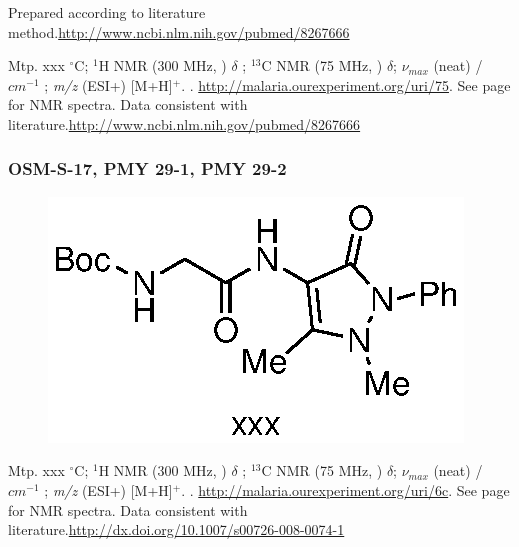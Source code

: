 \documentclass[12pt, a4paper,titlepage]{article}
\begin{document}
Prepared according to literature method.\url{http://www.ncbi.nlm.nih.gov/pubmed/8267666}

Mtp. xxx $^\circ$C;
$^1$H NMR (300 MHz, ) $\delta$ ; 
$^{13}$C NMR (75 MHz, ) $\delta$;
 $\nu_{max}$ (neat) /$cm^{-1}$ ;
\emph{m/z} (ESI+) [M+H]$^+$.
.
\url{http://malaria.ourexperiment.org/uri/75}.
 See page \pageref{spec:PMY27} for NMR spectra. Data consistent with literature.\url{http://www.ncbi.nlm.nih.gov/pubmed/8267666}

\subsubsection*{OSM-S-17, PMY 29-1, PMY 29-2}
\label{exp:PMY29}
	\begin{figure}[H]
	\begin{center}
	\includegraphics{exp/PMY29.eps}
	\end{center}
	\vspace{-25pt}	
	\end{figure}	

Mtp. xxx $^\circ$C;
$^1$H NMR (300 MHz, ) $\delta$ ; 
$^{13}$C NMR (75 MHz, ) $\delta$;
 $\nu_{max}$ (neat) /$cm^{-1}$ ;
\emph{m/z} (ESI+) [M+H]$^+$.
.
\url{http://malaria.ourexperiment.org/uri/6c}.
 See page \pageref{spec:PMY29} for NMR spectra. Data consistent with literature.\url{http://dx.doi.org/10.1007/s00726-008-0074-1}
\end{document}
